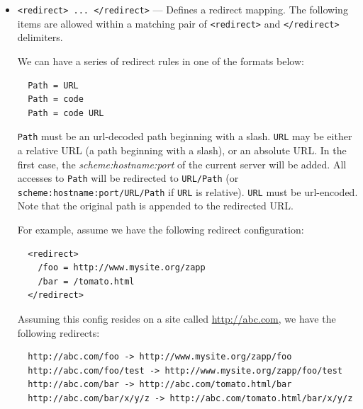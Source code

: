 \documentclass[11pt,oneside,english]{book}
\begin{document}
\begin{itemize}
\begin{itemize}
                 \item \verb+require_sni = true | false+ ---
                   If \textit{true}, the server will reject non-SNI clients and
                   clients providing an unknown SNI hostname (this last remark
                   is only relevant for the first virtual server of a SSL
                   group). This directive is ignored if SNI support is disabled
                   (or not supported).
                   Default is \textit{false}.
               \end{itemize}

\item       \verb+<redirect> ... </redirect>+ ---
              Defines a redirect mapping. The following items are allowed within
              a matching pair of \verb+<redirect>+ and \verb+</redirect>+
              delimiters.

              We can have a series of redirect rules in one of the formats below:
\begin{verbatim}
  Path = URL
  Path = code
  Path = code URL
\end{verbatim}
              \verb+Path+ must be an url-decoded path beginning with a
              slash. \verb+URL+ may be either a relative URL (a path beginning
              with a slash), or an absolute URL. In the first case, the
              \textit{scheme:hostname:port} of the current server will be
              added. All accesses to \verb+Path+ will be redirected to
              \verb+URL/Path+ (or \\ \verb+scheme:hostname:port/URL/Path+ if
              \verb+URL+ is relative). \verb+URL+ must be url-encoded. Note that
              the original path is appended to the redirected URL.

              For example, assume we have the following redirect configuration:
\begin{verbatim}
  <redirect>
    /foo = http://www.mysite.org/zapp
    /bar = /tomato.html
  </redirect>
\end{verbatim}
              Assuming this config resides on a site called
              \url{http://abc.com}, we have the following redirects:
\begin{verbatim}
  http://abc.com/foo -> http://www.mysite.org/zapp/foo
  http://abc.com/foo/test -> http://www.mysite.org/zapp/foo/test
  http://abc.com/bar -> http://abc.com/tomato.html/bar
  http://abc.com/bar/x/y/z -> http://abc.com/tomato.html/bar/x/y/z
\end{verbatim}


\end{itemize}
\end{document}
